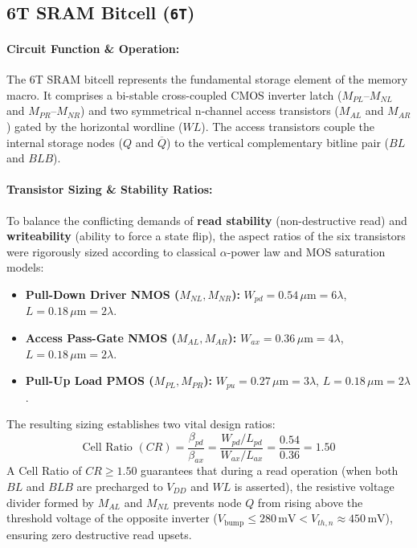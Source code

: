 \documentclass[10pt,a4paper,titlepage]{article}
\begin{document}
\subsection{6T SRAM Bitcell (\texttt{6T})}
\paragraph{Circuit Function \& Operation:} The 6T SRAM bitcell represents the fundamental storage element of the memory macro. It comprises a bi-stable cross-coupled CMOS inverter latch ($M_{PL}$--$M_{NL}$ and $M_{PR}$--$M_{NR}$) and two symmetrical n-channel access transistors ($M_{AL}$ and $M_{AR}$) gated by the horizontal wordline ($WL$). The access transistors couple the internal storage nodes ($Q$ and $\overline{Q}$) to the vertical complementary bitline pair ($BL$ and $BLB$).

\paragraph{Transistor Sizing \& Stability Ratios:} To balance the conflicting demands of \textbf{read stability} (non-destructive read) and \textbf{writeability} (ability to force a state flip), the aspect ratios of the six transistors were rigorously sized according to classical $\alpha$-power law and MOS saturation models:
\begin{itemize}[itemsep=2pt]
    \item \textbf{Pull-Down Driver NMOS ($M_{NL}, M_{NR}$):} $W_{pd} = 0.54\,\mu\text{m} = 6\lambda$, $L = 0.18\,\mu\text{m} = 2\lambda$.
    \item \textbf{Access Pass-Gate NMOS ($M_{AL}, M_{AR}$):} $W_{ax} = 0.36\,\mu\text{m} = 4\lambda$, $L = 0.18\,\mu\text{m} = 2\lambda$.
    \item \textbf{Pull-Up Load PMOS ($M_{PL}, M_{PR}$):} $W_{pu} = 0.27\,\mu\text{m} = 3\lambda$, $L = 0.18\,\mu\text{m} = 2\lambda$.
\end{itemize}

The resulting sizing establishes two vital design ratios:
\begin{equation}
    \text{Cell Ratio } (CR) = \frac{\beta_{pd}}{\beta_{ax}} = \frac{W_{pd} / L_{pd}}{W_{ax} / L_{ax}} = \frac{0.54}{0.36} = 1.50
\end{equation}
A Cell Ratio of $CR \ge 1.50$ guarantees that during a read operation (when both $BL$ and $BLB$ are precharged to $V_{DD}$ and $WL$ is asserted), the resistive voltage divider formed by $M_{AL}$ and $M_{NL}$ prevents node $Q$ from rising above the threshold voltage of the opposite inverter ($V_{\text{bump}} \le 280\,\text{mV} < V_{th,n} \approx 450\,\text{mV}$), ensuring zero destructive read upsets.
\end{document}
